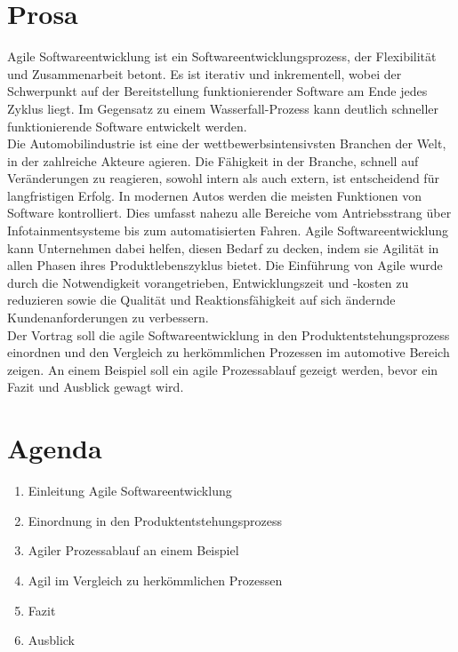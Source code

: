 \section*{Prosa}\label{prosa}
Agile Softwareentwicklung ist ein Softwareentwicklungsprozess, der Flexibilität und Zusammenarbeit betont. Es ist iterativ und inkrementell, wobei der Schwerpunkt auf der Bereitstellung funktionierender Software am Ende jedes Zyklus liegt. Im Gegensatz zu einem Wasserfall-Prozess kann deutlich schneller funktionierende Software entwickelt werden.\\

Die Automobilindustrie ist eine der wettbewerbsintensivsten Branchen der Welt, in der zahlreiche Akteure agieren. Die Fähigkeit in der Branche, schnell auf Veränderungen zu reagieren, sowohl intern als auch extern, ist entscheidend für langfristigen Erfolg. In modernen Autos werden die meisten Funktionen von Software kontrolliert. Dies umfasst nahezu alle Bereiche vom Antriebsstrang über Infotainmentsysteme bis zum automatisierten Fahren. Agile Softwareentwicklung kann Unternehmen dabei helfen, diesen Bedarf zu decken, indem sie Agilität in allen Phasen ihres Produktlebenszyklus bietet. Die Einführung von Agile wurde durch die Notwendigkeit vorangetrieben, Entwicklungszeit und -kosten zu reduzieren sowie die Qualität und Reaktionsfähigkeit auf sich ändernde Kundenanforderungen zu verbessern. \cite{Schlosser2016} \cite{katumba2014}\\

Der Vortrag \glqq\titleDocument\grqq{} soll die agile Softwareentwicklung in den Produktentstehungsprozess einordnen und den Vergleich zu herkömmlichen Prozessen im automotive Bereich zeigen. An einem Beispiel soll ein agile Prozessablauf gezeigt werden, bevor ein Fazit und Ausblick gewagt wird.\\

\section*{Agenda}
\begin{enumerate}
	\item Einleitung Agile Softwareentwicklung
	\item Einordnung in den Produktentstehungsprozess
	\item Agiler Prozessablauf an einem Beispiel
	\item Agil im Vergleich zu herkömmlichen Prozessen
	\item Fazit
	\item Ausblick
\end{enumerate}